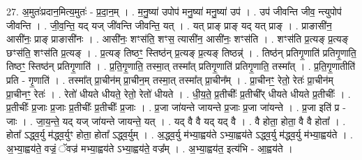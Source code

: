 \documentclass[17pt]{extarticle}
\begin{document}
27. अ॒मुतः॑प्रदान॒मित्य॒मुतः॑ - प्र॒दा॒न॒म् । . म॒नु॒ष्या॑ उपोप॑ मनु॒ष्या॑ मनु॒ष्या॑ उप॑ । . उप॑ जीवन्ति जीव॒ न्त्युपोप॑ जीवन्ति । . जी॒व॒न्ति॒ यद् यज् जी॑वन्ति जीवन्ति॒ यत् । . यत् प्राङ् प्राङ् यद् यत् प्राङ् । . प्राङासी॑न॒ आसी॑नः॒ प्राङ् प्राङासी॑नः । . आसी॑नः॒ शꣳस॑ति॒ शꣳस॒ त्यासी॑न॒ आसी॑नः॒ शꣳस॑ति । . शꣳस॑ति प्र॒त्यङ् प्र॒त्यङ् छꣳस॑ति॒ शꣳस॑ति प्र॒त्यङ् । . प्र॒त्यङ् तिष्ठꣳ॒॒ स्तिष्ठ॑न् प्र॒त्यङ् प्र॒त्यङ् तिष्ठन्न्॑ । . तिष्ठ॑न् प्रतिगृ॒णाति॑ प्रतिगृ॒णाति॒ तिष्ठꣳ॒॒ स्तिष्ठ॑न् प्रतिगृ॒णाति॑ । . प्र॒ति॒गृ॒णाति॒ तस्मा॒त् तस्मा᳚त् प्रतिगृ॒णाति॑ प्रतिगृ॒णाति॒ तस्मा᳚त् । . प्र॒ति॒गृ॒णातीति॑ प्रति - गृ॒णाति॑ । . तस्मा᳚त् प्रा॒चीन॑म् प्रा॒चीन॒म् तस्मा॒त् तस्मा᳚त् प्रा॒चीन᳚म् । . प्रा॒चीनꣳ॒॒ रेतो॒ रेतः॑ प्रा॒चीन॑म् प्रा॒चीनꣳ॒॒ रेतः॑ । . रेतो॑ धीयते धीयते॒ रेतो॒ रेतो॑ धीयते । . धी॒य॒ते॒ प्र॒तीचीः᳚ प्र॒तीची᳚र् धीयते धीयते प्र॒तीचीः᳚ । . प्र॒तीचीः᳚ प्र॒जाः प्र॒जाः प्र॒तीचीः᳚ प्र॒तीचीः᳚ प्र॒जाः । . प्र॒जा जा॑यन्ते जायन्ते प्र॒जाः प्र॒जा जा॑यन्ते । . प्र॒जा इति॑ प्र - जाः । . जा॒य॒न्ते॒ यद् यज् जा॑यन्ते जायन्ते॒ यत् । . यद् वै वै यद् यद् वै । . वै होता॒ होता॒ वै वै होता᳚ । . होता᳚ ऽद्ध्व॒र्यु म॑द्ध्व॒र्युꣳ होता॒ होता᳚ ऽद्ध्व॒र्युम् । . अ॒द्ध्व॒र्यु म॑भ्या॒ह्वय॑ते ऽभ्या॒ह्वय॑ते ऽद्ध्व॒र्यु म॑द्ध्व॒र्यु म॑भ्या॒ह्वय॑ते । . अ॒भ्या॒ह्वय॑ते॒ वज्रं॒ ॅवज्र॑ मभ्या॒ह्वय॑ते ऽभ्या॒ह्वय॑ते॒ वज्र᳚म् । . अ॒भ्या॒ह्वय॑त॒ इत्य॑भि - आ॒ह्वय॑ते । \newline
\end{document}
